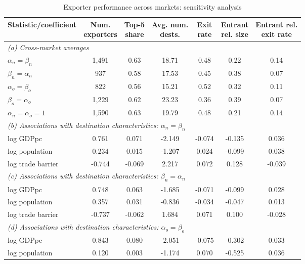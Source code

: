 \begin{table}[h!]
\footnotesize
\begin{center}
\caption{Exporter performance across markets: sensitivity analysis}
\label{app:tab:regs_alpha_beta}
\begin{tabular}{lcccccc}\toprule
Statistic/coefficient& \makecell{Num.\\exporters}& \makecell{Top-5\\share}& \makecell{Avg. num.\\dests.}& \makecell{Exit\\rate}& \makecell{Entrant\\rel. size}& \makecell{Entrant rel.\\exit rate}\\
\midrule
\multicolumn{7}{l}{\textit{(a) Cross-market averages}}\\[4pt]
$\alpha_n=\beta_n$& 1,491& 0.63& 18.71& 0.48& 0.22& 0.14\\
$\beta_n=\alpha_n$& 937& 0.58& 17.53& 0.45& 0.38& 0.07\\
$\alpha_o=\beta_o$& 822& 0.56& 15.21& 0.52& 0.32& 0.11\\
$\beta_o=\alpha_o$& 1,229& 0.62& 23.23& 0.36& 0.39& 0.07\\
$\alpha_n=\alpha_o=1$& 1,590& 0.63& 19.79& 0.48& 0.21& 0.14\\
\midrule\multicolumn{7}{l}{\textit{(b) Associations with destination characteristics: $\alpha_n=\beta_n$}}\\[4pt]
log GDPpc& 0.761& 0.071& -2.149& -0.074& -0.135& 0.036\\
log population& 0.234& 0.015& -1.207& 0.024& -0.099& 0.038\\
log trade barrier& -0.744& -0.069& 2.217& 0.072& 0.128& -0.039\\
\midrule\multicolumn{7}{l}{\textit{(c) Associations with destination characteristics: $\beta_n = \alpha_n$}}\\[4pt]
log GDPpc& 0.748& 0.063& -1.685& -0.071& -0.099& 0.028\\
log population& 0.357& 0.031& -0.836& -0.034& -0.047& 0.013\\
log trade barrier& -0.737& -0.062& 1.684& 0.071& 0.100& -0.028\\
\midrule\multicolumn{7}{l}{\textit{(d) Associations with destination characteristics: $\alpha_o=\beta_o$}}\\[4pt]
log GDPpc& 0.843& 0.080& -2.051& -0.075& -0.302& 0.033\\
log population& 0.120& 0.003& -1.174& 0.070& -0.525& 0.036\\

\end{tabular}
\end{center}
\end{table}
